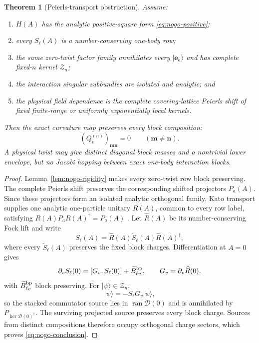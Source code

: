 \documentclass[11pt]{article}
\newtheorem{theorem}{Theorem}[section]
\theoremstyle{definition}
\theoremstyle{remark}
\newcommand{\cZ}{\mathcal Z}
\newcommand{\ket}[1]{\lvert #1\rangle}
\begin{document}
\begin{theorem}[Peierls-transport obstruction]
\label{thm:self-contained-nogo}
Assume:
\begin{enumerate}[label=\textup{(H\arabic*)},leftmargin=3.8em]
 \item $H(A)$ has the analytic positive-square form \eqref{eq:nogo-positive};
 \item every $S_\ell(A)$ is a number-conserving one-body row;
 \item the same zero-twist factor family annihilates every $\ket{\mathbf e_a}$ and has complete fixed-$n$ kernel $\cZ_n$;
 \item the interaction singular subbundles are isolated and analytic; and
 \item the physical field dependence is the complete covering-lattice Peierls shift of fixed finite-range or uniformly exponentially local kernels.
\end{enumerate}
Then the exact curvature map preserves every block composition:
\begin{equation}
 \boxed{(Q_v^{(n)})_{\mathbf m\mathbf n}=0\qquad(\mathbf m\ne\mathbf n).}
 \label{eq:nogo-conclusion}
\end{equation}
A physical twist may give distinct diagonal block masses and a nontrivial lower envelope, but no Jacobi hopping between exact one-body interaction blocks.
\end{theorem}

\begin{proof}
Lemma~\ref{lem:nogo-rigidity} makes every zero-twist row block preserving.  The complete Peierls shift preserves the corresponding shifted projectors $P_a(A)$.  Since these projectors form an isolated analytic orthogonal family, Kato transport supplies one analytic one-particle unitary $R(A)$, common to every row label, satisfying $R(A)P_aR(A)^\dagger=P_a(A)$ \cite[Chap.~II]{Kato1976}.  Let $\widehat R(A)$ be its number-conserving Fock lift and write
\begin{equation}
 S_\ell(A)=\widehat R(A)\widetilde S_\ell(A)\widehat R(A)^\dagger,
\end{equation}
where every $\widetilde S_\ell(A)$ preserves the fixed block charges.  Differentiation at $A=0$ gives
\begin{equation}
 \partial_vS_\ell(0)=[G_v,S_\ell(0)]+\widetilde B_{\ell v}^{\rm bp},
 \qquad
 G_v=\partial_v\widehat R(0),
\end{equation}
with $\widetilde B_{\ell v}^{\rm bp}$ block preserving.  For $\ket\psi\in\cZ_n$,
\begin{equation}
 [G_v,S_\ell]\ket\psi=-S_\ell G_v\ket\psi,
\end{equation}
so the stacked commutator source lies in $\operatorname{ran}\mathcal D(0)$ and is annihilated by $P_{\ker\mathcal D(0)^\dagger}$.  The surviving projected source preserves every block charge.  Sources from distinct compositions therefore occupy orthogonal charge sectors, which proves \eqref{eq:nogo-conclusion}.
\end{proof}
\end{document}
